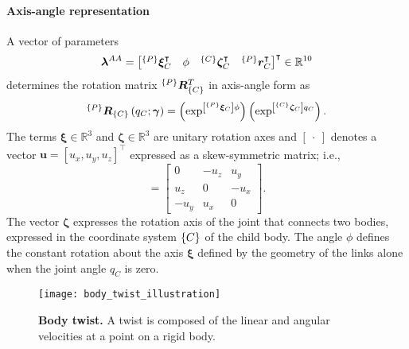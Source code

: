 \paragraph*{Axis-angle representation} A vector of parameters
\begin{equation}\label{eq:kinematic_parameters}
	\bm{\lambda}^{AA} = \begin{bmatrix}
		^{\left\lbrace P \right\rbrace}\bm{\xi}_{C}^\intercal & \phi & ^{\left\lbrace C \right\rbrace}\bm{\zeta}_{C}^\intercal & ^{\left\lbrace P \right\rbrace}\bm{r}^\intercal_C 
	\end{bmatrix}^\intercal \in \mathbb{R}^{10}
\end{equation}
determines the rotation matrix $^{\left\lbrace P \right\rbrace}\bm{R}^T_{\left\lbrace C \right\rbrace}$ in axis-angle form \cite{Lynch2017Modernrobotics} as
\begin{equation}\label{eq:rotation_matrix_axis_angle}
	^{\left\lbrace P \right\rbrace}\bm{R}_{\left\lbrace C \right\rbrace}\left(q_{C};\bm{\gamma}\right) = \left(\exp^{\left[{^{\left\lbrace P\right\rbrace}}\bm{\xi}_{C}\right]\phi}\right) \left(\exp^{\left[{^{\left\lbrace C\right\rbrace}}\bm{\zeta}_{C}\right] q_C}	\right).
\end{equation}
The terms $ \bm{\xi} \in \mathbb{R}^3$ and $ \bm{\zeta} \in \mathbb{R}^3$ are unitary rotation axes and $ \left[~\cdot~\right] $ denotes a vector $\bm{u} = \left[u_x,u_y,u_z\right]^\intercal$ expressed as a skew-symmetric matrix; i.e.,
\begin{equation}
	[\bm{u}] = \begin{bmatrix}
		0                & -u_z             & u_y \\
		u_z              & 0                     & -u_x \\
		-u_y             & u_x              & 0
	\end{bmatrix}.
\end{equation}
The vector $ \bm{\zeta}$ expresses the rotation axis of the joint that connects two bodies, expressed in the coordinate system ${\left\lbrace C \right\rbrace}$ of the child body. The angle $\phi$ defines the constant rotation about the axis $\bm{\xi}$ defined by the geometry of the links alone when the joint angle $q_C$ is zero.
\begin{figure}[t!]
	\begin{center}
		\texttt{[image: body\_twist\_illustration]}
		\caption{\textbf{Body twist.} A twist is composed of the linear and angular velocities at a point on a rigid body.}
		\label{fig:body_twist_illustration}
	\end{center}
\end{figure}


